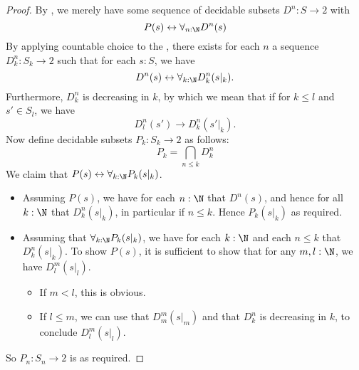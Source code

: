 \begin{proof}
  By , we merely have some sequence of decidable subsets $D^n:S\to 2$ 
  with 
  \begin{equation}
    P(s) \leftrightarrow \forall_{n:\N} D^n(s)
  \end{equation}
  By applying countable choice to the , there exists for each $n$ a sequence 
  $D^n_k: S_k\to 2$ such that for each $s:S$, we have 
  \begin{equation}
    D^n(s) \leftrightarrow \forall_{k:\N}D^n_k(s|_k).
  \end{equation}
  Furthermore, $D^n_k$ is decreasing in $k$, by which we mean that if 
  for $k\leq l$ and $s'\in S_l$, we have 
  \begin{equation}D^n_l(s')\to D^n_k(s'|_k).\end{equation}
  Now define decidable subsets $P_k:S_k \to 2$ as follows: 
  \begin{equation}
    P_k = \bigcap_{n\leq k} D^n_k
  \end{equation}
  We claim that $P(s) \leftrightarrow \forall_{k:\N} P_k(s|_k)$. 
  \begin{itemize}
    \item Assuming $P(s)$, we have for each $n:\N$ that $D^n(s)$, and hence for all $k:\N$ that 
      $D^n_k(s|_k)$, in particular if $n\leq k$. Hence $P_k(s|_k)$ as required.
    \item Assuming that $\forall_{k:\N} P_k(s|_k)$, 
      we have for each $k:\N$ and each $n\leq k$ that $D^n_k(s|_k)$. 
      To show $P(s)$, it is sufficient to show that for any $m,l:\N$, we have $D^m_l(s|_l)$.
      \begin{itemize}
        \item If $m < l$, this is obvious. 
        \item If $l\leq m$, we can use that $D^m_m(s|_m)$
          and that $D^n_k$ is decreasing in $k$, to conclude 
          $D^m_l(s|_l)$.
      \end{itemize} 
  \end{itemize}
  So $P_n:S_n\to 2$ is as required. 

\end{proof}


